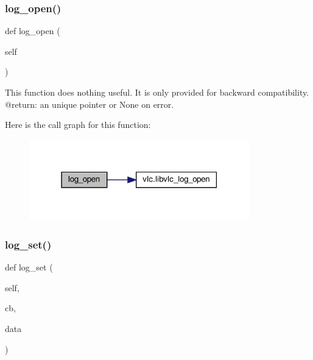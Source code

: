 \subsubsection{\texorpdfstring{log\+\_\+open()}{log\_open()}}
{\footnotesize\ttfamily def log\+\_\+open (\begin{DoxyParamCaption}\item[{}]{self }\end{DoxyParamCaption})}

\begin{DoxyVerb}This function does nothing useful.
It is only provided for backward compatibility.
@return: an unique pointer or None on error.
\end{DoxyVerb}
 Here is the call graph for this function\+:
\nopagebreak
\begin{figure}[H]
\begin{center}
\leavevmode
\includegraphics[width=271pt]{classvlc_1_1_instance_a5dd84157243a0595b4be8e4d3d884395_cgraph}
\end{center}
\end{figure}
\mbox{\label{classvlc_1_1_instance_ab18316368daf58ca970aa6369e9641eb}} 
\subsubsection{\texorpdfstring{log\+\_\+set()}{log\_set()}}
{\footnotesize\ttfamily def log\+\_\+set (\begin{DoxyParamCaption}\item[{}]{self,  }\item[{}]{cb,  }\item[{}]{data }\end{DoxyParamCaption})}

